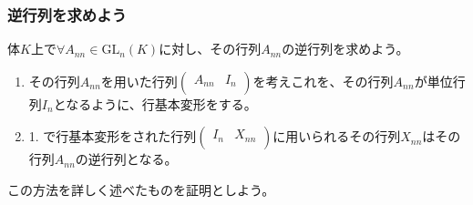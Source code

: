 \documentclass[dvipdfmx]{jsarticle}
\begin{document}
\subsubsection{逆行列を求めよう}%
\begin{thm}\label{2.1.8.10}
体$K$上で$\forall A_{nn} \in {\mathrm{GL}}_{n}(K)$に対し、その行列$A_{nn}$の逆行列を求めよう。
\begin{enumerate}
\item
  その行列$A_{nn}$を用いた行列$\begin{pmatrix}
  A_{nn} & I_{n} \\
  \end{pmatrix}$を考えこれを、その行列$A_{nn}$が単位行列$I_{n}$となるように、行基本変形をする。
\item
  1. で行基本変形をされた行列$\begin{pmatrix}
  I_{n} & X_{nn} \\
  \end{pmatrix}$に用いられるその行列$X_{nn}$はその行列$A_{nn}$の逆行列となる。
\end{enumerate}
\end{thm}\par
この方法を詳しく述べたものを証明としよう。
\end{document}
